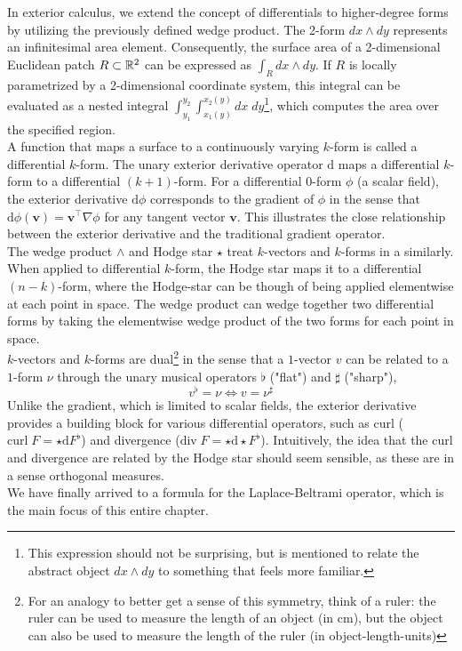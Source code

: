 In exterior calculus, we extend the concept of differentials to higher-degree forms by utilizing the previously defined wedge product. The 2-form $dx \wedge dy$ represents an infinitesimal area element. Consequently, the surface area of a 2-dimensional Euclidean patch $R \subset \mathbb{R}^2$ can be expressed as $\int_{R} dx \wedge dy$. If $R$ is locally parametrized by a 2-dimensional coordinate system, this integral can be evaluated as a nested integral $\int_{y_1}^{y_2}\int_{x_1(y)}^{x_2(y)} dx \; dy$\footnote{This expression should not be surprising, but is mentioned to relate the abstract object $dx \wedge dy$ to something that feels more familiar.}, which computes the area over the specified region.
\\
A function that maps a surface to a continuously varying $k$-form is called a differential $k$-form. The unary exterior derivative operator $\text{d}$ maps a differential $k$-form to a differential $(k+1)$-form. For a differential $0$-form $\phi$ (a scalar field), the exterior derivative $\text{d}\phi$ corresponds to the gradient of $\phi$ in the sense that 
$\text{d}\phi(\mathbf{v}) = \mathbf{v} ^\top \nabla \phi$ for any tangent vector $\mathbf{v}$. This illustrates the close relationship between the exterior derivative and the traditional gradient operator. 
\\
The wedge product $\wedge$ and Hodge star $\star$ treat $k$-vectors and $k$-forms in a similarly. When applied to differential $k$-form, the Hodge star maps it to a differential $(n-k)$-form, where the Hodge-star can be though of being applied elementwise at each point in space. The wedge product can wedge together two differential forms by taking the elementwise wedge product of the two forms for each point in space.
\\
$k$-vectors and $k$-forms are dual\footnote{For an analogy to better get a sense of this symmetry, think of a ruler: the ruler can be used to measure the length of an object (in $\text{cm}$), but the object can also be used to measure the length of the ruler (in object-length-units)} in the sense that a $1$-vector $v$ can be related to a $1$-form $\nu$ through the unary musical operators $\flat$ ("flat") and $\sharp$ ("sharp"), $$v^\flat = \nu \iff v = \nu^\sharp$$
Unlike the gradient, which is limited to scalar fields, the exterior derivative provides a building block for various differential operators, such as curl ($\text{curl}\;F =\star \text{d}F^\flat$) and divergence ($\text{div}\;F =\star \text{d}\star F^\flat$). Intuitively, the idea that the curl and divergence are related by the Hodge star should seem sensible, as these are in a sense orthogonal measures. \\ We have finally arrived to a formula for the Laplace-Beltrami operator, which is the main focus of this entire chapter. 
